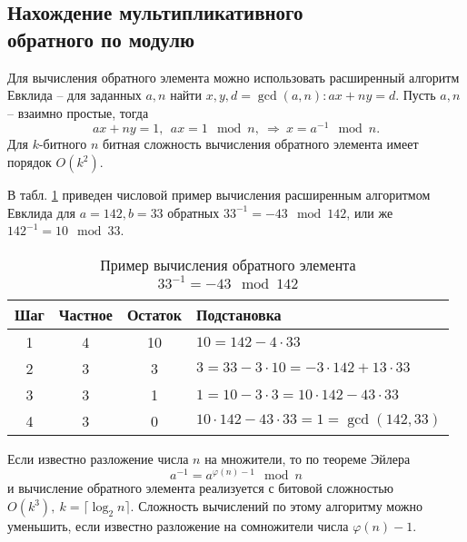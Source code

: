 \subsection[Нахождение мультипликативного обратного]{Нахождение мультипликативного \protect\\ обратного по модулю}

Для вычисления обратного элемента можно использовать расширенный алгоритм Евклида -- для заданных $a, n$ найти $x, y, d = \gcd(a,n): ax + ny = d$. Пусть $a,n$ -- взаимно простые, тогда
    \[ ax + ny = 1, ~~ ax = 1 \mod n, ~ \Rightarrow ~ x = a^{-1} \mod n. \]
Для $k$-битного $n$ битная сложность вычисления обратного элемента имеет порядок $O(k^2)$.

\example
В табл. \ref{tab:extended-euclid-inverse} приведен числовой пример вычисления расширенным алгоритмом Евклида для $a=142, b=33$ обратных $33^{-1} = -43 \mod 142$, или же $142^{-1} = 10 \mod 33$.

\begin{table}[!ht]
    \centering
    \caption{Пример вычисления обратного элемента \\ $33^{-1}  = -43 \mod 142$\label{tab:extended-euclid-inverse}}
    \begin{tabular}{|c|c|c|l|}
        \hline
        Шаг & Частное & Остаток & Подстановка \\
        \hline
        1 & 4 & 10 & $10 = 142 - 4 \cdot 33$ \\
        2 & 3 & 3  & $3 = 33 - 3 \cdot 10 = -3 \cdot 142 + 13 \cdot 33$ \\
        3 & 3 & 1  & $1 = 10 - 3 \cdot 3 = 10 \cdot 142 - 43 \cdot 33$ \\
        4 & 3 & 0  & $10 \cdot 142 - 43 \cdot 33 = 1 = \gcd(142,33)$ \\
        \hline
    \end{tabular}
\end{table}
\exampleend

Если известно разложение числа $n$ на множители, то по теореме Эйлера
    \[ a^{-1} = a^{\varphi(n) - 1} \mod n \]
и вычисление обратного элемента реализуется с битовой сложностью $O(k^3),~ k = \lceil \log_2 n \rceil$. Сложность вычислений по этому алгоритму можно уменьшить, если известно разложение на сомножители числа $\varphi(n) - 1$.
